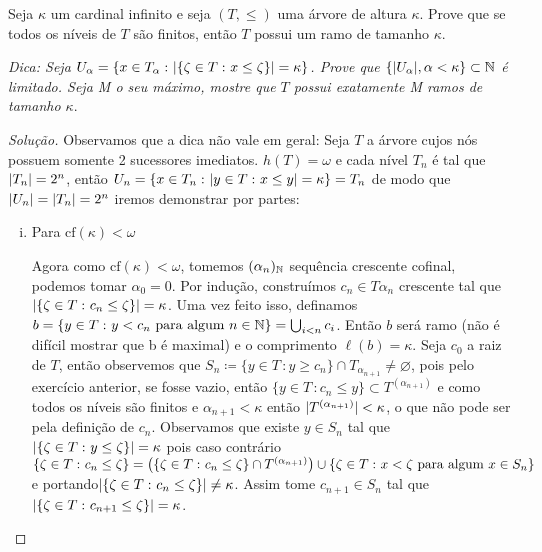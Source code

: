 \documentclass[a4paper]{article}
\begin{document}
\begin{exercicio}
  Seja \(\kappa\) um cardinal infinito e seja \((T,\leq)\) uma árvore de altura
  \(\kappa\). Prove que se todos os níveis de \(T\) são finitos, então \(T\)
  possui um ramo de tamanho \(\kappa\).
  
  \emph{Dica: Seja \(U_\alpha=\{x\in T_\alpha\,\colon\vert \{\zeta\in T\,\colon x\leq\zeta\} \vert=\kappa\}\). Prove que
  \(\{\vert U_\alpha \vert,\alpha<\kappa\}\subset\mathbb{N}\) é limitado. Seja M o seu
  máximo, mostre que \(T\) possui exatamente M ramos de tamanho \(\kappa\)}.
\end{exercicio}
\begin{proof}[Solução]
    Observamos que a dica não vale em geral: Seja
    \(T\) a árvore cujos nós possuem somente 2 sucessores imediatos.
    \(h(T)=\omega\) e cada nível \(T_n\) é   tal que \(\vert T_n \vert=2^n\),
    então \(U_n=\{x\in T_n\,\colon\vert y\in T\,\colon x\leq y \vert=\kappa\} =T_n\)
      de modo que \(\vert U_n \vert=\vert T_n \vert=2^n\) iremos demonstrar por partes:
  \begin{enumerate}[(i)]
      \item Para \(\text{cf}(\kappa)<\omega\)
      
      Agora como \(\text{cf}(\kappa)<\omega\), tomemos \((\alpha_n)_{\mathbb{N}}\)
      sequência crescente cofinal, podemos tomar \(\alpha_0=0\).
      Por indução, construímos \(c_n\in T{\alpha_n}\) crescente tal que
      \(\vert \{\zeta\in T\,\colon c_n\leq\zeta\} \vert=\kappa\). Uma vez feito isso, definamos
      \(b=\{y\in T\,\colon y<c_n\text{ para algum
      }n\in\mathbb{N}\}=\bigcup_{i<n}c_i\). Então \(b\) será ramo
      (não é difícil mostrar que b é maximal) e o  comprimento
      \(\ell(b)=\kappa\). Seja \(c_0\) a raiz de \(T\), então observemos que \mbox{\(S_n\coloneqq\{y\in
      T\,\colon y\geq c_n\}\cap T_{\alpha_{n+1}}\neq\varnothing\),}
      pois pelo exercício anterior, se fosse vazio, então
      \mbox{\(\{y\in T\,\colon c_n\leq y\}\subset T^{(\alpha_{n+1})}\)} e como todos os
      níveis são finitos e \(\alpha_{n+1}<\kappa\) então
      \(\vert T^{(\alpha_{n+1})} \vert<\kappa\), o que não pode ser pela definição de
      \(c_n\). Observamos que existe \(y\in S_n\) tal que
      \(\vert \{\zeta\in T\,\colon y\leq\zeta\} \vert=\kappa\) pois caso contrário
      \(\{\zeta\in T\,\colon c_n\leq\zeta\}=\big(\{\zeta\in T\,\colon c_n\leq\zeta\}\cap T^{(\alpha_{n+1})}\big)\cup\{\zeta\in
      T\,\colon x <\zeta\text{ para
        algum }x\in S_n\}\) e portando\(\vert \{\zeta\in T\,\colon c_n\leq\zeta\} \vert\neq\kappa\).
      Assim tome \(c_{n+1}\in S_n\) tal que \(\vert \{\zeta\in T\,\colon c_{n+1}\leq\zeta\} \vert=\kappa\).


\end{enumerate}
\end{proof}
\end{document}
